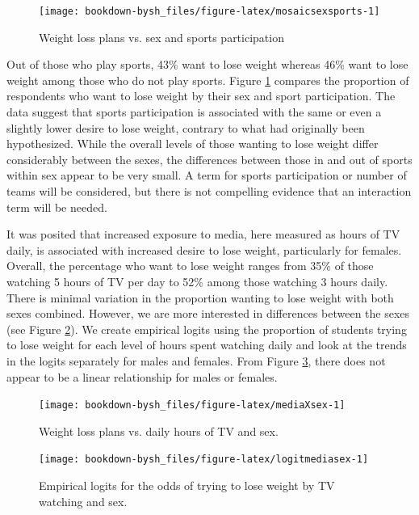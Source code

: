 \documentclass[
]{krantz}
\begin{document}
\begin{figure}

{\centering \texttt{[image: bookdown-bysh\_files/figure-latex/mosaicsexsports-1]} 

}

\caption{Weight loss plans vs. sex and sports participation}\label{fig:mosaicsexsports}
\end{figure}

Out of those who play sports, 43\% want to lose weight whereas 46\% want to lose weight among those who do not play sports. Figure \ref{fig:mosaicsexsports} compares the proportion of respondents who want to lose weight by their sex and sport participation. The data suggest that sports participation is associated with the same or even a slightly lower desire to lose weight, contrary to what had originally been hypothesized. While the overall levels of those wanting to lose weight differ considerably between the sexes, the differences between those in and out of sports within sex appear to be very small. A term for sports participation or number of teams will be considered, but there is not compelling evidence that an interaction term will be needed.

It was posited that increased exposure to media, here measured as hours of TV daily, is associated with increased desire to lose weight, particularly for females. Overall, the percentage who want to lose weight ranges from 35\% of those watching 5 hours of TV per day to 52\% among those watching 3 hours daily. There is minimal variation in the proportion wanting to lose weight with both sexes combined. However, we are more interested in differences between the sexes (see Figure \ref{fig:mediaXsex}). We create empirical logits using the proportion of students trying to lose weight for each level of hours spent watching daily and look at the trends in the logits separately for males and females. From Figure \ref{fig:logitmediasex}, there does not appear to be a linear relationship for males or females.

\begin{figure}

{\centering \texttt{[image: bookdown-bysh\_files/figure-latex/mediaXsex-1]} 

}

\caption{Weight loss plans vs. daily hours of TV and sex.}\label{fig:mediaXsex}
\end{figure}

\begin{figure}

{\centering \texttt{[image: bookdown-bysh\_files/figure-latex/logitmediasex-1]} 

}

\caption{Empirical logits for the odds of trying to lose weight by TV watching and sex.}\label{fig:logitmediasex}
\end{figure}
\end{document}
